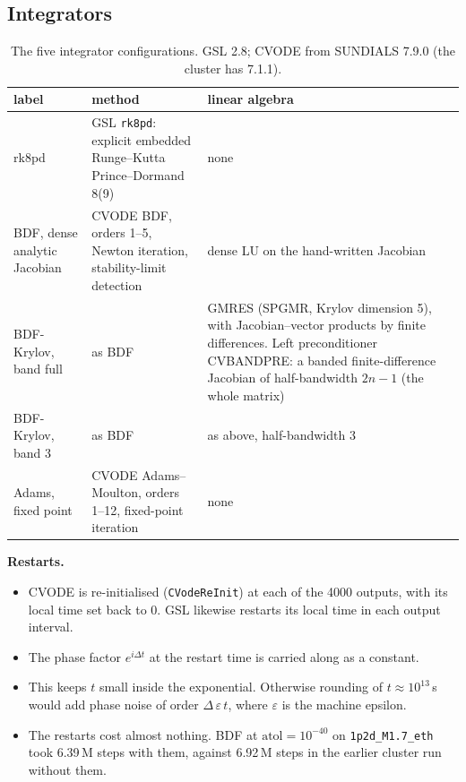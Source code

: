 \documentclass[10pt,a4paper]{article}
\newcommand{\atol}{\mathrm{atol}}
\begin{document}
\subsection{Integrators}
\begin{table}[h]
    \centering\small
    \caption{The five integrator configurations. GSL 2.8; CVODE from SUNDIALS 7.9.0 (the cluster has 7.1.1).}
    \begin{tabular}{@{}>{\raggedright}p{2.8cm}>{\raggedright}p{5.9cm}>{\raggedright\arraybackslash}p{8.5cm}@{}}
        \toprule
        label & method & linear algebra \\
        \midrule
        rk8pd & GSL \texttt{rk8pd}: explicit embedded Runge--Kutta Prince--Dormand 8(9) & none \\
        BDF, dense analytic Jacobian & CVODE BDF, orders 1--5, Newton iteration, stability-limit detection & dense LU on the hand-written Jacobian \\
        BDF-Krylov, band full & as BDF & GMRES (SPGMR, Krylov dimension 5), with Jacobian--vector products by finite differences. Left preconditioner CVBANDPRE: a banded finite-difference Jacobian of half-bandwidth $2n-1$ (the whole matrix) \\
        BDF-Krylov, band 3 & as BDF & as above, half-bandwidth 3 \\
        Adams, fixed point & CVODE Adams--Moulton, orders 1--12, fixed-point iteration & none \\
        \bottomrule
    \end{tabular}
\end{table}

\textbf{Restarts.}
\begin{itemize}
    \item CVODE is re-initialised (\texttt{CVodeReInit}) at each of the 4000 outputs, with its local time set back to 0. GSL likewise restarts its local time in each output interval.
    \item The phase factor $e^{i\Delta t}$ at the restart time is carried along as a constant.
    \item This keeps $t$ small inside the exponential. Otherwise rounding of $t\approx10^{13}$\,s would add phase noise of order $\Delta\,\varepsilon\,t$, where $\varepsilon$ is the machine epsilon.
    \item The restarts cost almost nothing. BDF at $\atol=10^{-40}$ on \texttt{1p2d\_M1.7\_eth} took 6.39\,M steps with them, against 6.92\,M steps in the earlier cluster run without them.
\end{itemize}
\end{document}
